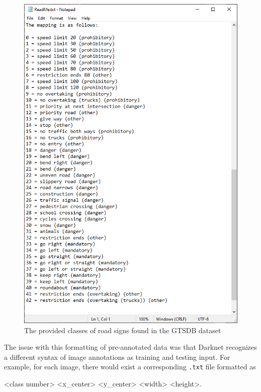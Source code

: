 \documentclass{article}
\begin{document}
            \begin{figure}[h!]
                \centering
                \includegraphics[scale=0.5]{original_classes}
                \caption{The provided classes of road signs found in the GTSDB dataset}
            \end{figure}
            \pagebreak
            
            The issue with this formatting of pre-annotated data was that Darknet recognizes a different syntax of image annotations as training and testing input. For example, for each image, there would exist a corresponding \texttt{.txt} file formatted as
            
            \begin{center}
                \textless class number\textgreater \; \textless x\_center\textgreater \; \textless y\_center\textgreater \; \textless width\textgreater \; \textless height\textgreater.
            \end{center}
        
\end{document}
